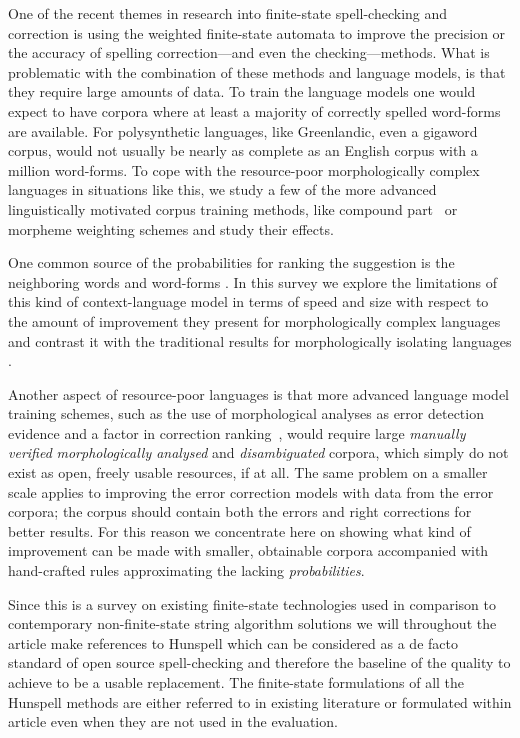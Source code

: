 \documentclass[a4paper,12pt]{article}
\begin{document}
One of the recent themes in research into finite-state spell-checking and
correction is using the weighted finite-state automata to improve the precision
or the accuracy of spelling correction---and even the checking---methods.
What is problematic with the combination of these methods and language models,
is that they require large amounts of data. To train the language models one
would expect to have corpora where at least a majority of correctly spelled
word-forms are available.  For polysynthetic languages, like Greenlandic, even
a gigaword corpus, would not usually be nearly as complete as an English corpus
with a million word-forms. To cope with the resource-poor morphologically
complex languages in situations like this, we study a few of the more
advanced linguistically motivated corpus training methods, like compound
part~\cite[]{pirinen/2009/nodalida} or morpheme weighting schemes and study
their effects.

One common source of the probabilities for ranking the suggestion is the
neighboring words and word-forms \cite[]{pirinen2012improving,otero/2007}.  In
this survey we explore the limitations of this kind of context-language model
in terms of speed and size with respect to the amount of improvement they
present for morphologically complex languages and contrast it with the
traditional results for morphologically isolating languages
\cite[]{mays/1991,wilcoxohearn2008realword}.

Another aspect of resource-poor languages is that more advanced language model
training schemes, such as the use of morphological analyses as error detection
evidence \cite[]{mays/1991} and a factor in correction
ranking~\cite[]{otero/2007}, would require large \emph{manually verified}
\emph{morphologically analysed} and \emph{disambiguated} corpora, which simply
do not exist as open, freely usable resources, if at all. The same problem on a
smaller scale applies to improving the error correction models with data from
the error corpora; the corpus should contain both the errors and right
corrections for better results. For this reason we concentrate here on showing
what kind of improvement can be made with smaller, obtainable corpora
accompanied with hand-crafted rules approximating the lacking
\emph{probabilities}.

Since this is a survey on existing finite-state technologies used in comparison
to contemporary non-finite-state string algorithm solutions we will throughout
the article make references to Hunspell which can be considered as a de facto
standard of open source spell-checking and therefore the baseline of the
quality to achieve to be a usable replacement. The finite-state formulations of
all the Hunspell methods are either referred to in existing literature or
formulated within article even when they are not used in the evaluation.
\end{document}
